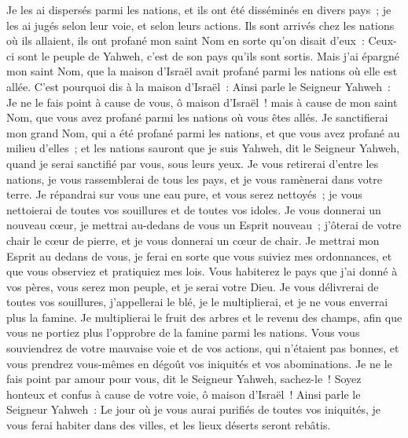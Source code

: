 \begin{multicols}{2}
Je les ai dispersés parmi les nations, et ils ont été disséminés en divers pays~; je les ai jugés selon leur voie, et selon leurs actions.
Ils sont arrivés chez les nations où ils allaient, ils ont profané mon saint Nom en sorte qu'on disait d'eux~: Ceux-ci sont le peuple de Yahweh, c'est de son pays qu'ils sont sortis.
Mais j'ai épargné mon saint Nom, que la maison d'Israël avait profané parmi les nations où elle est allée.
C'est pourquoi dis à la maison d'Israël~: Ainsi parle le Seigneur Yahweh~: Je ne le fais point à cause de vous, ô maison d'Israël~! mais à cause de mon saint Nom, que vous avez profané parmi les nations où vous êtes allés.
Je sanctifierai mon grand Nom, qui a été profané parmi les nations, et que vous avez profané au milieu d'elles~; et les nations sauront que je suis Yahweh, dit le Seigneur Yahweh, quand je serai sanctifié par vous, sous leurs yeux.
Je vous retirerai d'entre les nations, je vous rassemblerai de tous les pays, et je vous ramènerai dans votre terre.
Je répandrai sur vous une eau pure, et vous serez nettoyés~; je vous nettoierai de toutes vos souillures et de toutes vos idoles.
Je vous donnerai un nouveau cœur, je mettrai au-dedans de vous un Esprit nouveau~; j'ôterai de votre chair le cœur de pierre, et je vous donnerai un cœur de chair.
Je mettrai mon Esprit au dedans de vous, je ferai en sorte que vous suiviez mes ordonnances, et que vous observiez et pratiquiez mes lois.
Vous habiterez le pays que j'ai donné à vos pères, vous serez mon peuple, et je serai votre Dieu.
Je vous délivrerai de toutes vos souillures, j'appellerai le blé, je le multiplierai, et je ne vous enverrai plus la famine.
Je multiplierai le fruit des arbres et le revenu des champs, afin que vous ne portiez plus l'opprobre de la famine parmi les nations.
Vous vous souviendrez de votre mauvaise voie et de vos actions, qui n'étaient pas bonnes, et vous prendrez vous-mêmes en dégoût vos iniquités et vos abominations.
Je ne le fais point par amour pour vous, dit le Seigneur Yahweh, sachez-le~! Soyez honteux et confus à cause de votre voie, ô maison d'Israël~!
Ainsi parle le Seigneur Yahweh~: Le jour où je vous aurai purifiés de toutes vos iniquités, je vous ferai habiter dans des villes, et les lieux déserts seront rebâtis.

\end{multicols}
